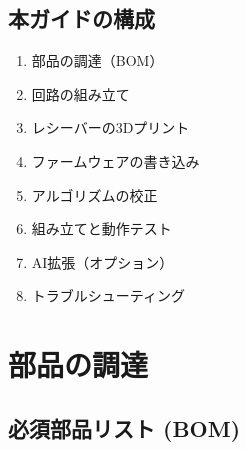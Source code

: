 \documentclass[a4paper,11pt]{article}
\begin{document}
\subsection{本ガイドの構成}

\begin{enumerate}
  \item 部品の調達（BOM）
  \item 回路の組み立て
  \item レシーバーの3Dプリント
  \item ファームウェアの書き込み
  \item アルゴリズムの校正
  \item 組み立てと動作テスト
  \item AI拡張（オプション）
  \item トラブルシューティング
\end{enumerate}

\newpage
\section{部品の調達}

\subsection{必須部品リスト (BOM)}
\end{document}
